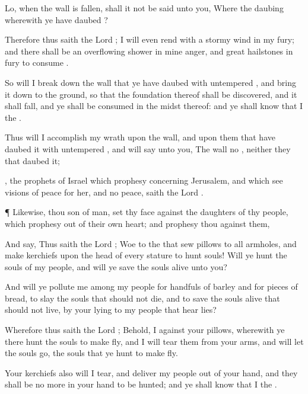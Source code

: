 {Lo, when the
wall is
fallen, shall it not be
said unto you, Where
{} the
daubing wherewith ye have
daubed
{}?

Therefore thus
saith the
Lord
{}; I will even
rend
{} with a
stormy
wind in my
fury; and there shall be an
overflowing
shower in mine
anger, and great
hailstones in
{}
fury to
consume
{}.

So will I break
down the
wall that ye have
daubed with
untempered
{}, and
bring it down to the
ground, so that the
foundation thereof shall be
discovered, and it shall
fall, and ye shall be
consumed in the
midst thereof: and ye shall
know that I
{} the
{}.

Thus will I
accomplish my
wrath upon the
wall, and upon them that have
daubed it with
untempered
{}, and will
say unto you, The
wall
{} no
{}, neither they that
daubed it;

, the
prophets of
Israel which
prophesy concerning
Jerusalem, and which
see
visions of
peace for her, and
{} no
peace,
saith the
Lord
{}.


\par }{\PP {}¶ Likewise, thou
son of
man,
set thy
face against the
daughters of thy
people, which
prophesy out of their own
heart; and
prophesy thou against them,

And
say, Thus
saith the
Lord
{};
Woe to the
{} that
sew
pillows to all
armholes, and
make
kerchiefs upon the
head of every
stature to
hunt
souls! Will ye
hunt the
souls of my
people, and will ye
save the
souls
alive
{} unto you?

And will ye
pollute me among my
people for
handfuls of
barley and for
pieces of
bread, to
slay the
souls that should not
die, and to
save the
souls
alive that should not
live, by your
lying to my
people that
hear
{}
lies?

Wherefore thus
saith the
Lord
{}; Behold, I
{} against your
pillows, wherewith
ye there
hunt the
souls to make
{}
fly, and I will
tear them from your
arms, and will let the
souls
go,
{} the
souls that ye
hunt to make
{}
fly.

Your
kerchiefs also will I
tear, and
deliver my
people out of your
hand, and they shall be no more in your
hand to be
hunted; and ye shall
know that I
{} the
{}.

}
